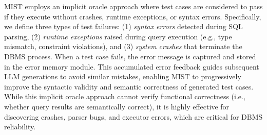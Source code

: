 MIST employs an implicit oracle approach where test cases are considered to pass if they execute without crashes, runtime exceptions, or syntax errors. Specifically, we define three types of test failures: (1) \textit{syntax errors} detected during SQL parsing, (2) \textit{runtime exceptions} raised during query execution (e.g., type mismatch, constraint violations), and (3) \textit{system crashes} that terminate the DBMS process. When a test case fails, the error message is captured and stored in the error memory module. This accumulated error feedback guides subsequent LLM generations to avoid similar mistakes, enabling MIST to progressively improve the syntactic validity and semantic correctness of generated test cases. While this implicit oracle approach cannot verify functional correctness (i.e., whether query results are semantically correct), it is highly effective for discovering crashes, parser bugs, and executor errors, which are critical for DBMS reliability.




